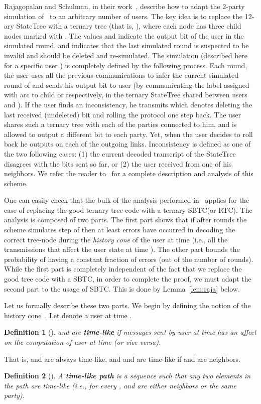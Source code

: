 \documentclass[ letterpaper, 11pt]{article}
\newtheorem{definition}{Definition}
\newcommand{\statetree}{{\textsf{StateTree}}\xspace}
\newcommand{\RTBC}{\textsf{RTC}\xspace}
\newcommand{\KTC}{\textsf{SBTC}\xspace}
\begin{document}
Rajagopalan and Schulman, in their work~\cite{RS94},
describe how to adapt the 2-party simulation of~\cite{schulman96}
to an arbitrary number of users. The key idea is to replace the 12-ary \statetree
with a ternary tree (that is, ),
where each node has three child nodes marked with .
The values  and  indicate the output bit of the user in the simulated round,
and  indicates that the last simulated round is suspected to be invalid
and should be  deleted and re-simulated.
The simulation (described here for a specific user )
is completely defined by the following process. Each round, the user uses all the previous communications to infer the current simulated round of  and sends his output bit to user  (by communicating the label assigned with arc to child   or  respectively,
in the ternary \statetree shared between users  and ).
If the user finds an inconsistency, he transmits
 which denotes deleting the last received (undeleted) bit and rolling the protocol  one step back. The user shares such a ternary tree with each of the  parties connected to him, and is allowed
to output a different bit to each party. Yet, when the user decides to roll back he outputs
 on each of the outgoing links. Inconsistency is defined as one of the two following cases:
(1) the current decoded transcript of the \statetree disagrees with the bits sent so far, or (2)
the user received  from one of his neighbors.
We refer the reader to~\cite{RS94} for a complete description and analysis of this scheme.


One can easily check that the bulk of the analysis performed in~\cite{RS94} applies
for the case of replacing the good ternary tree code with a ternary \KTC (or \RTBC).
The analysis is composed of two parts. The first part shows that if after
 rounds the scheme simulates step  of  then at least
 errors have occurred in decoding the correct tree-node during
the \emph{history cone} of the user at time  (i.e., all the transmissions
that affect the user state at time ). The other part
bounds the probability of having a constant fraction of errors (out of the number of rounds).
While the first part is completely independent of the
fact that we replace the good tree code with a \KTC,
in order to complete the proof, we must adapt the second part to the usage of \KTC. This is done by
Lemma~\ref{lem:raja} below.

Let us formally describe these two parts.
We begin by defining the notion of the history cone~\cite{RS94}.
Let  denote a user  at time .
\begin{definition}[\cite{RS94}]
 and  are \textbf{time-like} if messages sent by user  at time  has an affect on
the computation of user  at time  (or vice versa).
\end{definition}
That is,  and  are always time-like,
and  and  are time-like if  and  are neighbors.
\begin{definition}[\cite{RS94}]
A \textbf{ time-like path} is a sequence 
such that  any two elements in the path are time-like
(i.e., for every ,  and  are either neighbors or the same party).
\end{definition}
\end{document}
